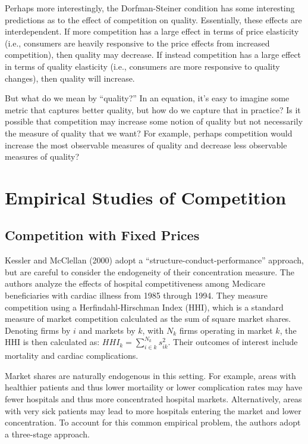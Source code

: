 \documentclass[
  letterpaper,
  DIV=11,
  numbers=noendperiod]{scrreport}
\theoremstyle{definition}
\theoremstyle{remark}
\begin{document}
Perhaps more interestingly, the Dorfman-Steiner condition has some
interesting predictions as to the effect of competition on quality.
Essentially, these effects are interdependent. If more competition has a
large effect in terms of price elasticity (i.e., consumers are heavily
responsive to the price effects from increased competition), then
quality may decrease. If instead competition has a large effect in terms
of quality elasticity (i.e., consumers are more responsive to quality
changes), then quality will increase.

But what do we mean by ``quality?'' In an equation, it's easy to imagine
some metric that captures better quality, but how do we capture that in
practice? Is it possible that competition may increase some notion of
quality but not necessarily the measure of quality that we want? For
example, perhaps competition would increase the most observable measures
of quality and decrease less observable measures of quality?

\hypertarget{empirical-studies-of-competition}{%
\section{Empirical Studies of
Competition}\label{empirical-studies-of-competition}}

\hypertarget{competition-with-fixed-prices-1}{%
\subsection{Competition with Fixed
Prices}\label{competition-with-fixed-prices-1}}

Kessler and McClellan (2000) adopt a ``structure-conduct-performance''
approach, but are careful to consider the endogeneity of their
concentration measure. The authors analyze the effects of hospital
competitiveness among Medicare beneficiaries with cardiac illness from
1985 through 1994. They measure competition using a Herfindahl-Hirschman
Index (HHI), which is a standard measure of market competition
calculated as the sum of square market shares. Denoting firms by \(i\)
and markets by \(k\), with \(N_{k}\) firms operating in market \(k\),
the HHI is then calculated as:
\(HHI_{k}=\sum_{i \in k}^{N_{k}} s_{ik}^{2}.\) Their outcomes of
interest include mortality and cardiac complications.

Market shares are naturally endogenous in this setting. For example,
areas with healthier patients and thus lower mortaility or lower
complication rates may have fewer hospitals and thus more concentrated
hospital markets. Alternatively, areas with very sick patients may lead
to more hospitals entering the market and lower concentration. To
account for this common empirical problem, the authors adopt a
three-stage approach.
\end{document}
